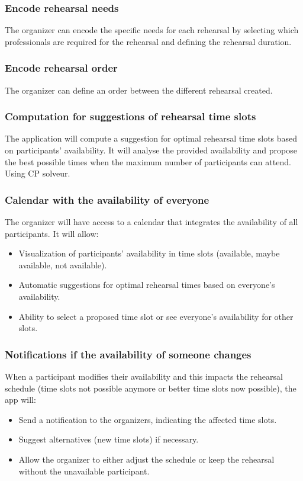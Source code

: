 \documentclass[11pt]{article}
\begin{document}
\subsubsection{Encode rehearsal needs}
The organizer can encode the specific needs for each rehearsal by selecting which professionals are required for the rehearsal and defining the rehearsal duration. 

\subsubsection{Encode rehearsal order}
The organizer can define an order between the different rehearsal created.

\subsubsection{Computation for suggestions of rehearsal time slots} 
The application will compute a suggestion for optimal rehearsal time slots based on participants' availability. It will analyse the provided availability and propose the best possible times when the maximum number of participants can attend. Using CP solveur.

\subsubsection{Calendar with the availability of everyone}
The organizer will have access to a calendar that integrates the availability of all participants. It will allow:
\begin{itemize}
    \item Visualization of participants' availability in time slots (available, maybe available, not available).
    \item Automatic suggestions for optimal rehearsal times based on everyone's availability.
    \item Ability to select a proposed time slot or see everyone's availability for other slots.
\end{itemize}

\subsubsection{Notifications if the availability of someone changes}
When a participant modifies their availability and this impacts the rehearsal schedule (time slots not possible anymore or better time slots now possible), the app will:
\begin{itemize}
    \item Send a notification to the organizers, indicating the affected time slots.
    \item Suggest alternatives (new time slots) if necessary.
    \item Allow the organizer to either adjust the schedule or keep the rehearsal without the unavailable participant.
\end{itemize}
\end{document}
